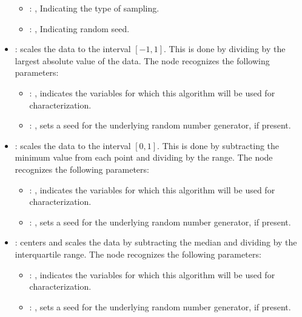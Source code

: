 \begin{itemize}
\begin{itemize}
        \item {}: , 
          Indicating the type of sampling.

        \item {}: , 
          Indicating random seed.
      \end{itemize}

    \item {}:
      scales the data to the interval $[-1, 1]$. This is done by dividing by     the largest
      absolute value of the data.
      The  node recognizes the following parameters:
        \begin{itemize}
          \item {}: , 
            indicates the variables for which this algorithm will be used for characterization.
          \item {}: , 
            sets a seed for the underlying random number generator, if present.
      \end{itemize}

    \item {}:
      scales the data to the interval $[0, 1]$. This is done by subtracting the
      minimum value from each point and dividing by the range.
      The  node recognizes the following parameters:
        \begin{itemize}
          \item {}: , 
            indicates the variables for which this algorithm will be used for characterization.
          \item {}: , 
            sets a seed for the underlying random number generator, if present.
      \end{itemize}

    \item {}:
      centers and scales the data by subtracting the median and dividing by     the interquartile
      range.
      The  node recognizes the following parameters:
        \begin{itemize}
          \item {}: , 
            indicates the variables for which this algorithm will be used for characterization.
          \item {}: , 
            sets a seed for the underlying random number generator, if present.
      \end{itemize}


\end{itemize}
